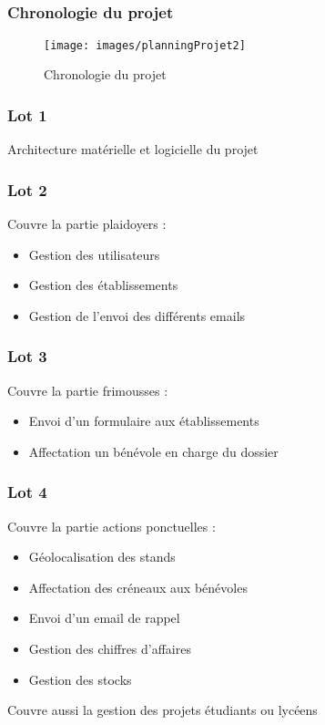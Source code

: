 
\speaker{\Mathieu}
\subsection{} %


\begin{frame}
	\frametitle{Chronologie du projet}
	\begin{figure}
		\begin{landscape}
		\texttt{[image: images/planningProjet2]}
		\end{landscape}
        \caption{Chronologie du projet}
	\end{figure} 
\end{frame}




\begin{frame}
	\frametitle{Lot 1}
	Architecture matérielle et logicielle du projet
\end{frame}


\speaker{\Michel}
\begin{frame}
	\frametitle{Lot 2}
	Couvre la partie plaidoyers :
	\begin{itemize}
		\item Gestion des utilisateurs
		\item Gestion des établissements
		\item Gestion de l'envoi des différents emails
	\end{itemize}
\end{frame}

\begin{frame}
	\frametitle{Lot 3}
	Couvre la partie frimousses :
	\begin{itemize}
		\item Envoi d'un formulaire aux établissements
		\item Affectation un bénévole en charge du dossier
	\end{itemize}
\end{frame}


\begin{frame}
	\frametitle{Lot 4}
	Couvre la partie actions ponctuelles :
	\begin{itemize}
		\item Géolocalisation des stands
		\item Affectation des créneaux aux bénévoles
		\item Envoi d'un email de rappel
		\item Gestion des chiffres d'affaires
		\item Gestion des stocks
	\end{itemize}
	Couvre aussi la gestion des projets étudiants ou lycéens
\end{frame}